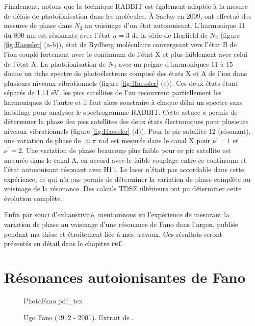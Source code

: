 Finalement, notons que la technique RABBIT est également adaptée à la mesure de délais de photoionisation dans les molécules. \`A Saclay en 2009,  ont effectué des mesures de phase dans $N_2$ au voisinage d'un état autoionisant. L'harmonique 11 du 800 nm est résonante avec l'état $n=3$ de la série de Hopfield de $N_2$ (figure \ref{fig:Haessler} (a-b)), état de Rydberg moléculaire convergeant vers l'état B de l'ion couplé fortement avec le continuum de l'état X et plus faiblement avec celui de l'état A. La photoionisation de $N_2$ avec un peigne d'harmoniques 11 à 15 donne un riche spectre de photoélectrons composé des états X et A de l'ion dans plusieurs niveaux vibrationnels (figure \ref{fig:Haessler} (c)). Ces deux états étant séparés de 1.11 eV, les pics satellites de l'un recouvrent partiellement les harmoniques de l'autre et il faut alors soustraire à chaque délai un spectre sans habillage pour analyser le spectrogramme RABBIT. Cette astuce a permis de déterminer la phase des pics satellites des deux états électroniques pour plusieurs niveaux vibrationnels (figure \ref{fig:Haessler} (d)). Pour le pic satellite 12 (résonant), une variation de phase de $\approx \pi$ rad est mesurée dans le canal X pour $\nu^{'} = 1$ et $\nu^{'} = 2$. Une variation de phase beaucoup plus faible pour ce pic satellite est mesurée dans le canal A, en accord avec le faible couplage entre ce continuum et l'état autoionisant résonant avec H11. Le laser n'était pas accordable dans cette expérience, ce qui n'a pas permis de déterminer la variation de phase complète au voisinage de la résonance. Des calculs TDSE ultérieurs  ont pu déterminer cette évolution complète.

Enfin par souci d'exhaustivité, mentionnons ici l'expérience de  mesurant la variation de phase au voisinage d'une résonance de Fano dans l'argon, publiée pendant ma thèse et étroitement liée à mes travaux. Ces résultats seront présentés en détail dans le chapitre \textbf{ref}.

\chapter{Résonances autoionisantes de Fano}
\label{chap:ResonancesFano}
\begin{figure}[h]
\centering
\def\svgwidth{0.3\textwidth}
{PhotoFano.pdf_tex}
\caption{Ugo Fano (1912 - 2001). Extrait de .}
\label{fig:PhotoFano}
\end{figure}

